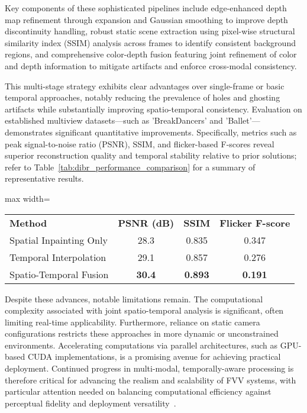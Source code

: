 \documentclass[sigconf]{acmart}
\begin{document}
Key components of these sophisticated pipelines include edge-enhanced depth map refinement through expansion and Gaussian smoothing to improve depth discontinuity handling, robust static scene extraction using pixel-wise structural similarity index (SSIM) analysis across frames to identify consistent background regions, and comprehensive color-depth fusion featuring joint refinement of color and depth information to mitigate artifacts and enforce cross-modal consistency.

This multi-stage strategy exhibits clear advantages over single-frame or basic temporal approaches, notably reducing the prevalence of holes and ghosting artifacts while substantially improving spatio-temporal consistency. Evaluation on established multiview datasets—such as 'BreakDancers' and 'Ballet'—demonstrates significant quantitative improvements. Specifically, metrics such as peak signal-to-noise ratio (PSNR), SSIM, and flicker-based F-scores reveal superior reconstruction quality and temporal stability relative to prior solutions; refer to Table~\ref{tab:dibr_performance_comparison} for a summary of representative results.

\begin{table*}[htbp]
\centering
\caption{Performance comparison of DIBR approaches on multiview datasets.}
\label{tab:dibr_performance_comparison}
\begin{adjustbox}{max width=\textwidth}
\begin{tabular}{@{}lccc@{}}
\toprule
\textbf{Method} & \textbf{PSNR (dB)} & \textbf{SSIM} & \textbf{Flicker F-score} \\
Spatial Inpainting Only   & 28.3 & 0.835 & 0.347 \\
Temporal Interpolation    & 29.1 & 0.857 & 0.276 \\
Spatio-Temporal Fusion    & \textbf{30.4} & \textbf{0.893} & \textbf{0.191} \\
\bottomrule
\end{tabular}
\end{adjustbox}
\end{table*}

Despite these advances, notable limitations remain. The computational complexity associated with joint spatio-temporal analysis is significant, often limiting real-time applicability. Furthermore, reliance on static camera configurations restricts these approaches in more dynamic or unconstrained environments. Accelerating computations via parallel architectures, such as GPU-based CUDA implementations, is a promising avenue for achieving practical deployment. Continued progress in multi-modal, temporally-aware processing is therefore critical for advancing the realism and scalability of FVV systems, with particular attention needed on balancing computational efficiency against perceptual fidelity and deployment versatility~\cite{refFVVRef98}.
\end{document}
